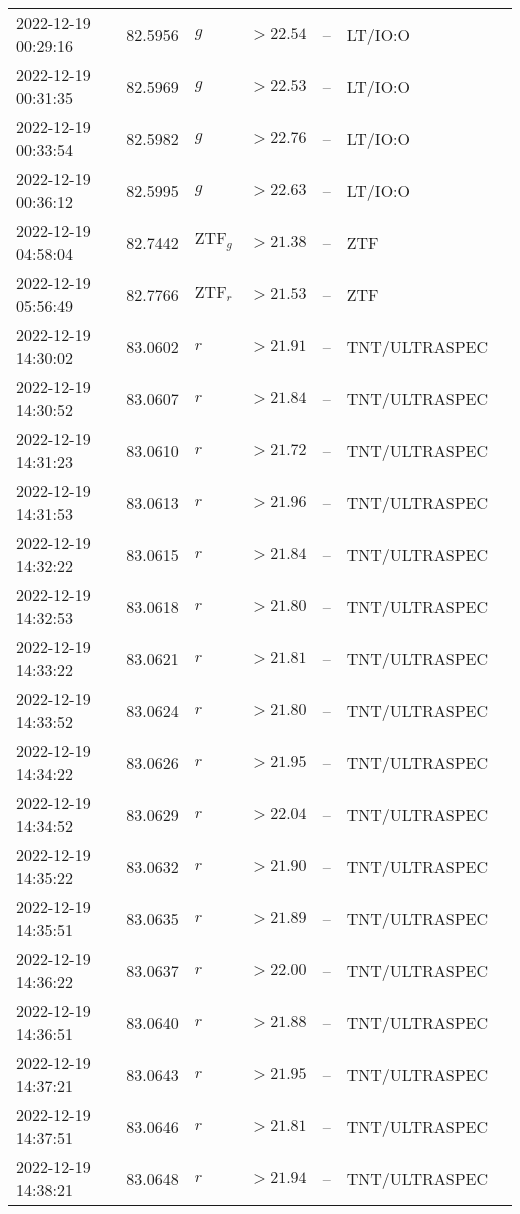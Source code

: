 \documentclass{nature_plusfigure}
\begin{document}
\begin{supplement}
\begin{center}
\begin{longtable}{lllllll}
2022-12-19 00:29:16 & 82.5956 & $g$ & $>22.54$ & -- & LT/IO:O &  \\ 
2022-12-19 00:31:35 & 82.5969 & $g$ & $>22.53$ & -- & LT/IO:O &  \\ 
2022-12-19 00:33:54 & 82.5982 & $g$ & $>22.76$ & -- & LT/IO:O &  \\ 
2022-12-19 00:36:12 & 82.5995 & $g$ & $>22.63$ & -- & LT/IO:O &  \\ 
2022-12-19 04:58:04 & 82.7442 & $\mathrm{ZTF}_{g}$ & $>21.38$ & -- & ZTF &  \\ 
2022-12-19 05:56:49 & 82.7766 & $\mathrm{ZTF}_{r}$ & $>21.53$ & -- & ZTF &  \\ 
2022-12-19 14:30:02 & 83.0602 & $r$ & $>21.91$ & -- & TNT/ULTRASPEC &  \\ 
2022-12-19 14:30:52 & 83.0607 & $r$ & $>21.84$ & -- & TNT/ULTRASPEC &  \\ 
2022-12-19 14:31:23 & 83.0610 & $r$ & $>21.72$ & -- & TNT/ULTRASPEC &  \\ 
2022-12-19 14:31:53 & 83.0613 & $r$ & $>21.96$ & -- & TNT/ULTRASPEC &  \\ 
2022-12-19 14:32:22 & 83.0615 & $r$ & $>21.84$ & -- & TNT/ULTRASPEC &  \\ 
2022-12-19 14:32:53 & 83.0618 & $r$ & $>21.80$ & -- & TNT/ULTRASPEC &  \\ 
2022-12-19 14:33:22 & 83.0621 & $r$ & $>21.81$ & -- & TNT/ULTRASPEC &  \\ 
2022-12-19 14:33:52 & 83.0624 & $r$ & $>21.80$ & -- & TNT/ULTRASPEC &  \\ 
2022-12-19 14:34:22 & 83.0626 & $r$ & $>21.95$ & -- & TNT/ULTRASPEC &  \\ 
2022-12-19 14:34:52 & 83.0629 & $r$ & $>22.04$ & -- & TNT/ULTRASPEC &  \\ 
2022-12-19 14:35:22 & 83.0632 & $r$ & $>21.90$ & -- & TNT/ULTRASPEC &  \\ 
2022-12-19 14:35:51 & 83.0635 & $r$ & $>21.89$ & -- & TNT/ULTRASPEC &  \\ 
2022-12-19 14:36:22 & 83.0637 & $r$ & $>22.00$ & -- & TNT/ULTRASPEC &  \\ 
2022-12-19 14:36:51 & 83.0640 & $r$ & $>21.88$ & -- & TNT/ULTRASPEC &  \\ 
2022-12-19 14:37:21 & 83.0643 & $r$ & $>21.95$ & -- & TNT/ULTRASPEC &  \\ 
2022-12-19 14:37:51 & 83.0646 & $r$ & $>21.81$ & -- & TNT/ULTRASPEC &  \\ 
2022-12-19 14:38:21 & 83.0648 & $r$ & $>21.94$ & -- & TNT/ULTRASPEC &  \\ 

\end{longtable}
\end{center}
\end{supplement}
\end{document}
